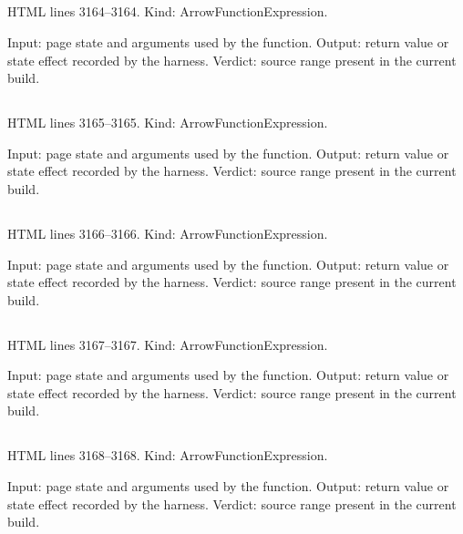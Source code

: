 \subsection*{\texttt{}}
\label{vf_85_esc}
HTML lines 3164--3164. Kind: ArrowFunctionExpression.

Input: page state and arguments used by the function.
Output: return value or state effect recorded by the harness.
Verdict: source range present in the current build.

\subsection*{\texttt{}}
\label{vf_86_num}
HTML lines 3165--3165. Kind: ArrowFunctionExpression.

Input: page state and arguments used by the function.
Output: return value or state effect recorded by the harness.
Verdict: source range present in the current build.

\subsection*{\texttt{}}
\label{vf_87_fmt}
HTML lines 3166--3166. Kind: ArrowFunctionExpression.

Input: page state and arguments used by the function.
Output: return value or state effect recorded by the harness.
Verdict: source range present in the current build.

\subsection*{\texttt{}}
\label{vf_88_pill}
HTML lines 3167--3167. Kind: ArrowFunctionExpression.

Input: page state and arguments used by the function.
Output: return value or state effect recorded by the harness.
Verdict: source range present in the current build.

\subsection*{\texttt{}}
\label{vf_89_dt}
HTML lines 3168--3168. Kind: ArrowFunctionExpression.

Input: page state and arguments used by the function.
Output: return value or state effect recorded by the harness.
Verdict: source range present in the current build.

